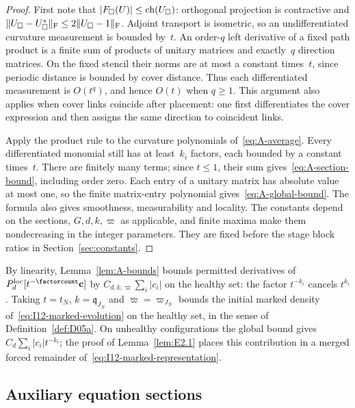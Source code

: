 \begin{proof}
First note that $|F_\square(U)|\le\operatorname{ch}(U_\square)$: orthogonal projection is contractive and $\|U_\square-U_\square^*\|_{\rm F}\le2\|U_\square-1\|_{\rm F}$. Adjoint transport is isometric, so an undifferentiated curvature measurement is bounded by~$t$. An order-$q$ left derivative of a fixed path product is a finite sum of products of unitary matrices and exactly~$q$ direction matrices. On the fixed stencil their norms are at most a constant times~$t$, since periodic distance is bounded by cover distance. Thus each differentiated measurement is $O(t^q)$, and hence $O(t)$ when $q\ge1$. This argument also applies when cover links coincide after placement: one first differentiates the cover expression and then assigns the same direction to coincident links.

Apply the product rule to the curvature polynomials of~\eqref{eq:A-average}. Every differentiated monomial still has at least~$k_i$ factors, each bounded by a constant times~$t$. There are finitely many terms; since $t\le1$, their sum gives~\eqref{eq:A-section-bound}, including order zero. Each entry of a unitary matrix has absolute value at most one, so the finite matrix-entry polynomial gives~\eqref{eq:A-global-bound}. The formula also gives smoothness, measurability and locality. The constants depend on the sections, $G,d,k,\varpi$ as applicable, and finite maxima make them nondecreasing in the integer parameters. They are fixed before the stage block ratios in Section~\ref{sec:constants}.
\end{proof}

By linearity, Lemma~\ref{lem:A-bounds} bounds permitted derivatives of $\localsection{d}[t^{-\factorcount}\mathbf c]$ by $C_{d,k,\varpi}\sum_i|c_i|$ on the healthy set: the factor $t^{-k_i}$ cancels $t^{k_i}$. Taking $t=t_N$, $k=\mathfrak q_{J_N}$ and $\varpi=\varpi_{J_N}$ bounds the initial marked density of~\eqref{eq:I12-marked-evolution} on the healthy set, in the sense of Definition~\ref{def:D05a}. On unhealthy configurations the global bound gives $C_d\sum_i|c_i|t^{-k_i}$; the proof of Lemma~\ref{lem:E2.1} places this contribution in a merged forced remainder of~\eqref{eq:I12-marked-representation}.

\subsection{Auxiliary equation sections}\label{sec:A-equations}

